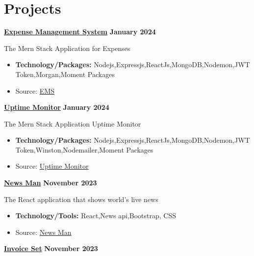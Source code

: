 \documentclass[letterpaper, 11pt]{article}
\newcommand{\bulletSpace}{\vspace{-8pt}}
\newcommand{\secStartSpace}{\vspace{3pt}}
\newcommand{\spaceCollapse}{\vspace{-5pt}}
\begin{document}



\section{\color{blue} \textbf{Projects}}
\secStartSpace

\begin{addmargin}[1em]{1em}
\noindent\href{https://github.com/sukhlotey/Expense-Management-System}{\textbf{Expense Management System}}  \hfill \textbf{January 2024} 
		
	\noindent The Mern Stack Application for Expenses
	\spaceCollapse
	\begin{itemize}
		\item \textbf{Technology/Packages:} Nodejs,Expressjs,ReactJs,MongoDB,Nodemon,JWT Token,Morgan,Moment Packages
		      \bulletSpace
		\item Source:  \href{https://github.com/sukhlotey/Expense-Management-System}{\underline{EMS}}
	\end{itemize}
		
 \noindent\href{https://github.com/sukhlotey/Uptime-monitor}{\textbf{Uptime Monitor}}  \hfill \textbf{January 2024} 
		
	\noindent The Mern Stack Application Uptime Monitor
	\spaceCollapse
	\begin{itemize}
		\item \textbf{Technology/Packages:} Nodejs,Expressjs,ReactJs,MongoDB,Nodemon,JWT Token,Winston,Nodemailer,Moment Packages
		      \bulletSpace
		\item Source:  \href{https://github.com/sukhlotey/Uptime-monitor}{\underline{Uptime Monitor}}
	\end{itemize}
	\noindent\href{https://github.com/sukhlotey/newsdaily}{\textbf{News Man}}  \hfill \textbf{November 2023} 
		
	\noindent The React application that shows world's live news
	\spaceCollapse
	\begin{itemize}
		\item \textbf{Technology/Tools:} React,News api,Bootstrap, CSS
		      \bulletSpace
        
		\item Source:  \href{https://github.com/sukhlotey/newsdaily}{\underline{News Man}}
	\end{itemize}
 \noindent\href{https://github.com/sukhlotey/invoice-set}{\textbf{Invoice Set}}  \hfill \textbf{November 2023} 
		

\end{addmargin}
\end{document}
